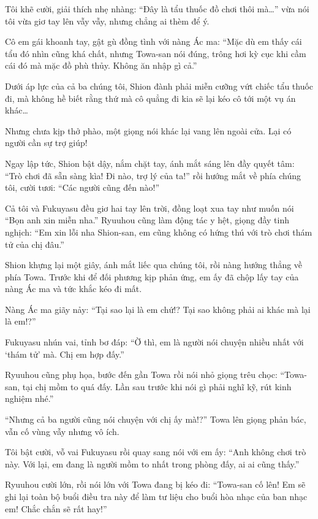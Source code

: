 \documentclass[../main.tex]{subfiles}
\begin{document}
Tôi khẽ cười, giải thích nhẹ nhàng: ``Đây là tẩu thuốc đồ chơi thôi mà\dots'' vừa nói tôi vừa giơ tay lên vẫy vẫy, nhưng chẳng ai thèm để ý.

Cô em gái khoanh tay, gật gù đồng tình với nàng Ác ma: ``Mặc dù em thấy cái tẩu đó nhìn cũng khá chất, nhưng Towa-san nói đúng, trông hơi kỳ cục khi cầm cái đó mà mặc đồ phù thủy. Không ăn nhập gì cả.''

Dưới áp lực của cả ba chúng tôi, Shion đành phải miễn cưỡng vứt chiếc tẩu thuốc đi, mà không hề biết rằng thứ mà cô quẳng đi kia sẽ lại kéo cô tới một vụ án khác\dots

Nhưng chưa kịp thở phào, một giọng nói khác lại vang lên ngoài cửa. Lại có người cần sự trợ giúp!

Ngay lập tức, Shion bật dậy, nắm chặt tay, ánh mắt sáng lên đầy quyết tâm: ``Trò chơi đã sẵn sàng kìa! Đi nào, trợ lý của ta!'' rồi hướng mắt về phía chúng tôi, cười tươi: ``Các người cũng đến nào!''

Cả tôi và Fukuyasu đều giơ hai tay lên trời, đồng loạt xua tay như muốn nói ``Bọn anh xin miễn nha.'' Ryuuhou cũng làm động tác y hệt, giọng đầy tinh nghịch: ``Em xin lỗi nha Shion-san, em cũng không có hứng thú với trò chơi thám tử của chị đâu.''

Shion khựng lại một giây, ánh mắt liếc qua chúng tôi, rồi nàng hướng thẳng về phía Towa. Trước khi để đối phương kịp phản ứng, em ấy đã chộp lấy tay của nàng Ác ma và tức khắc kéo đi mất.


Nàng Ác ma giãy nảy: ``Tại sao lại là em chứ!? Tại sao không phải ai khác mà lại là em!?''

Fukuyasu nhún vai, tỉnh bơ đáp: ``Ờ thì, em là người nói chuyện nhiều nhất với `thám tử' mà. Chị em hợp đấy.''

Ryuuhou cũng phụ họa, bước đến gần Towa rồi nói nhỏ giọng trêu chọc: ``Towa-san, tại chị mồm to quá đấy. Lần sau trước khi nói gì phải nghĩ kỹ, rút kinh nghiệm nhé.''

``Nhưng cả ba người cũng nói chuyện với chị ấy mà!?'' Towa lên giọng phản bác, vẫn cố vùng vẫy nhưng vô ích.

Tôi bật cười, vỗ vai Fukuyasu rồi quay sang nói với em ấy: ``Anh không chơi trò này. Với lại, em đang là người mồm to nhất trong phòng đấy, ai ai cũng thấy.''

Ryuuhou cười lớn, rồi nói lớn với Towa đang bị kéo đi: ``Towa-san cố lên! Em sẽ ghi lại toàn bộ buổi điều tra này để làm tư liệu cho buổi hòa nhạc của ban nhạc em! Chắc chắn sẽ rất hay!''
\end{document}

